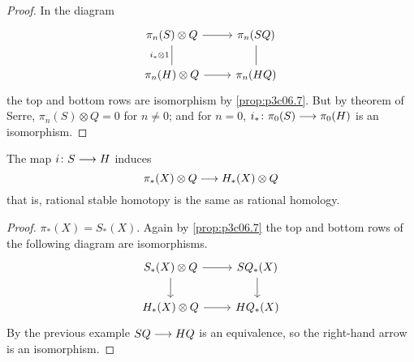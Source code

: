 \documentclass[../main]{subfiles}
\begin{document}
\begin{proof}
In the diagram
\[\begin{tikzcd}
	{\pi_n(S)\otimes Q} & {\pi_n(SQ)} \\
	{\pi_n(H)\otimes Q} & {\pi_n(HQ)}
	\arrow[from=1-1, to=1-2]
	\arrow[from=2-1, to=2-2]
	\arrow["{i_\ast \otimes 1}"', no head, from=1-1, to=2-1]
	\arrow[no head, from=1-2, to=2-2]
\end{tikzcd}\]
the top and bottom rows are isomorphism by \ref{prop:p3c06.7}. But by theorem of Serre, $\pi_n(S)\otimes Q=0$ for $n\neq 0$; and for $n=0$, $i_\ast\colon\pi_0(S)\longrightarrow\pi_0(H)$ is an isomorphism.
\end{proof}

\begin{example}
 The map $i\colon S \longrightarrow H$ induces
 \[\pi_\ast(X)\otimes Q\longrightarrow H_\ast(X)\otimes Q\]
 that is, rational stable homotopy is the same as rational homology.
\end{example}

\begin{proof}
$\pi_\ast(X)=S_\ast(X)$. Again by \ref{prop:p3c06.7} the top and bottom rows of the following diagram are isomorphisms.
\[\begin{tikzcd}
	{S_\ast(X)\otimes Q} & {SQ_\ast(X)} \\
	{H_\ast(X)\otimes Q} & {HQ_\ast(X)}
	\arrow[from=1-1, to=1-2]
	\arrow[from=1-1, to=2-1]
	\arrow[from=1-2, to=2-2]
	\arrow[from=2-1, to=2-2]
\end{tikzcd}\]
By the previous example $SQ\longrightarrow HQ$ is an equivalence, so the right-hand arrow is an isomorphism.
\end{proof}
\end{document}
